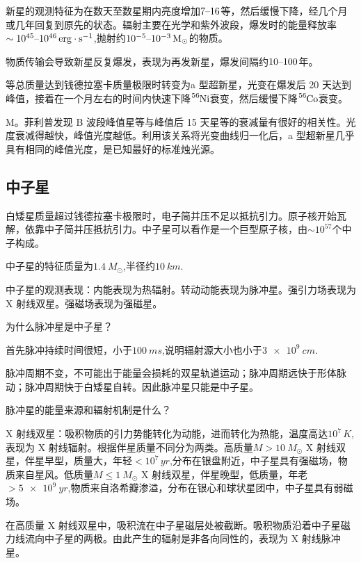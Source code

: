 \documentclass[../天体物理基础.tex]{subfiles}
\begin{document}
新星的观测特征为在数天至数星期内亮度增加$7\text{\textendash}16$等，然后缓慢下降，经几个月或几年回复到原先的状态。辐射主要在光学和紫外波段，爆发时的能量释放率$\sim10^{45}\text{\textendash}10^{46}\,\unit{erg\cdot{}s^{-1}}$,抛射约$10^{-5}\text{\textendash}10^{-3}\,\unit{M_{\odot}}$的物质。

物质传输会导致新星反复爆发，表现为再发新星，爆发间隔约$10\text{\textendash}100$年。

等总质量达到钱德拉塞卡质量极限时转变为\uppercase\expandafter{}a 型超新星，光变在爆发后 20 天达到峰值，接着在一个月左右的时间内快速下降$\ce{^{56}Ni}$衰变，然后缓慢下降$\ce{^{56}Co}$衰变。

M。菲利普发现 B 波段峰值星等与峰值后 15 天星等的衰减量有很好的相关性。光度衰减得越快，峰值光度越低。利用该关系将光变曲线归一化后，\uppercase\expandafter{}a 型超新星几乎具有相同的峰值光度，是已知最好的标准烛光源。

\subsection{中子星}

白矮星质量超过钱德拉塞卡极限时，电子简并压不足以抵抗引力。原子核开始瓦解，依靠中子简并压抵抗引力。中子星可以看作是一个巨型原子核，由$\sim10^{57}$个中子构成。

中子星的特征质量为$\qty{1.4}{M_{\odot}}$,半径约$\qty{10}{km}$.

中子星的观测表现：内能表现为热辐射。转动动能表现为脉冲星。强引力场表现为 X 射线双星。强磁场表现为强磁星。

为什么脉冲星是中子星？

首先脉冲持续时间很短，小于$\qty{100}{ms}$,说明辐射源大小也小于$\qty{3e9}{cm}$.

脉冲周期不变，不可能出于能量会损耗的双星轨道运动；脉冲周期远快于形体脉动；脉冲周期快于白矮星自转。因此脉冲星只能是中子星。

脉冲星的能量来源和辐射机制是什么？


X 射线双星：吸积物质的引力势能转化为动能，进而转化为热能，温度高达$10^{7}\,\unit{K}$,表现为 X 射线辐射。根据伴星质量不同分为两类。高质量$M>\qty{10}{M_{\odot}}$ X 射线双星，伴星早型，质量大，年轻$<10^{7}\,\unit{yr}$,分布在银盘附近，中子星具有强磁场，物质来自星风。低质量$M\le\qty{1}{M_{\odot}}$ X 射线双星，伴星晚型，低质量，年老$>\qty{5e9}{yr}$,物质来自洛希瓣渗溢，分布在银心和球状星团中，中子星具有弱磁场。

在高质量 X 射线双星中，吸积流在中子星磁层处被截断。吸积物质沿着中子星磁力线流向中子星的两极。由此产生的辐射是非各向同性的，表现为 X 射线脉冲星。
\end{document}
